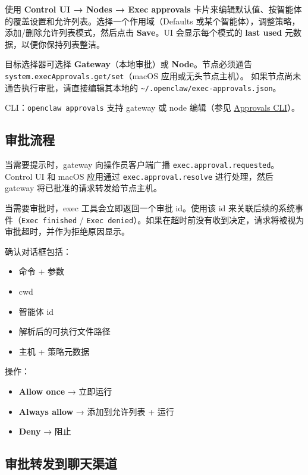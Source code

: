 使用 \textbf{Control UI → Nodes → Exec approvals} 卡片来编辑默认值、按智能体的覆盖设置和允许列表。选择一个作用域（Defaults 或某个智能体），调整策略，添加/删除允许列表模式，然后点击 \textbf{Save}。UI 会显示每个模式的 \textbf{last used} 元数据，以便你保持列表整洁。

目标选择器可选择 \textbf{Gateway}（本地审批）或 \textbf{Node}。节点必须通告 \texttt{system.execApprovals.get/set}（macOS 应用或无头节点主机）。
如果节点尚未通告执行审批，请直接编辑其本地的 \texttt{\textasciitilde{}/.openclaw/exec-approvals.json}。

CLI：\texttt{openclaw approvals} 支持 gateway 或 node 编辑（参见 \href{/cli/approvals}{Approvals CLI}）。

\subsection{审批流程}


当需要提示时，gateway 向操作员客户端广播 \texttt{exec.approval.requested}。
Control UI 和 macOS 应用通过 \texttt{exec.approval.resolve} 进行处理，然后 gateway 将已批准的请求转发给节点主机。

当需要审批时，exec 工具会立即返回一个审批 id。使用该 id 来关联后续的系统事件（\texttt{Exec finished} / \texttt{Exec denied}）。如果在超时前没有收到决定，请求将被视为审批超时，并作为拒绝原因显示。

确认对话框包括：

\begin{itemize}
  \item 命令 + 参数
  \item cwd
  \item 智能体 id
  \item 解析后的可执行文件路径
  \item 主机 + 策略元数据
\end{itemize}


操作：

\begin{itemize}
  \item \textbf{Allow once} → 立即运行
  \item \textbf{Always allow} → 添加到允许列表 + 运行
  \item \textbf{Deny} → 阻止
\end{itemize}


\subsection{审批转发到聊天渠道}


